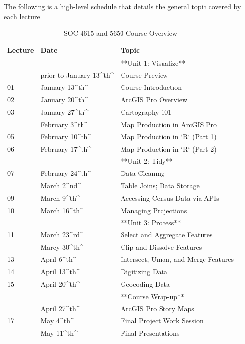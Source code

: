 \documentclass[]{book}
\begin{document}
The following is a high-level schedule that details the general topic covered by each lecture.

\begin{table}

\caption{\label{tab:unnamed-chunk-1}SOC 4615 and 5650 Course Overview}
\centering
\begin{tabular}[t]{lll}
\toprule
Lecture & Date & Topic\\
\midrule
 &  & **Unit 1: Visualize**\\
 & prior to January 13\textasciicircum{}th\textasciicircum{} & Course Preview\\
01 & January 13\textasciicircum{}th\textasciicircum{} & Course Introduction\\
02 & January 20\textasciicircum{}th\textasciicircum{} & ArcGIS Pro Overview\\
03 & January 27\textasciicircum{}th\textasciicircum{} & Cartography 101\\
\addlinespace
04 & February 3\textasciicircum{}th\textasciicircum{} & Map Production in ArcGIS Pro\\
05 & February 10\textasciicircum{}th\textasciicircum{} & Map Production in `R` (Part 1)\\
06 & February 17\textasciicircum{}th\textasciicircum{} & Map Production in `R` (Part 2)\\
 &  & **Unit 2: Tidy**\\
07 & February 24\textasciicircum{}th\textasciicircum{} & Data Cleaning\\
\addlinespace
08 & March 2\textasciicircum{}nd\textasciicircum{} & Table Joins; Data Storage\\
09 & March 9\textasciicircum{}th\textasciicircum{} & Accessing Census Data via APIs\\
10 & March 16\textasciicircum{}th\textasciicircum{} & Managing Projections\\
 &  & **Unit 3: Process**\\
11 & March 23\textasciicircum{}rd\textasciicircum{} & Select and Aggregate Features\\
\addlinespace
12 & Marcy 30\textasciicircum{}th\textasciicircum{} & Clip and Dissolve Features\\
13 & April 6\textasciicircum{}th\textasciicircum{} & Intersect, Union, and Merge Features\\
14 & April 13\textasciicircum{}th\textasciicircum{} & Digitizing Data\\
15 & April 20\textasciicircum{}th\textasciicircum{} & Geocoding Data\\
 &  & **Course Wrap-up**\\
\addlinespace
16 & April 27\textasciicircum{}th\textasciicircum{} & ArcGIS Pro Story Maps\\
17 & May 4\textasciicircum{}th\textasciicircum{} & Final Project Work Session\\
 & May 11\textasciicircum{}th\textasciicircum{} & Final Presentations\\
\bottomrule
\end{tabular}
\end{table}
\end{document}
